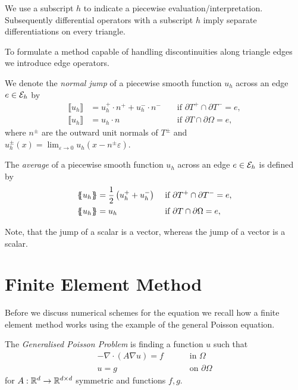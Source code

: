 We use a subscript $h$ to indicate a piecewise evaluation/interpretation. Subsequently differential operators with a subscript $h$ imply separate differentiations on every triangle.

To formulate a method capable of handling discontinuities along triangle edges we introduce edge operators.   

\begin{definition}
We denote the \emph{normal jump} of  a piecewise smooth function $u_h$ across an edge $e \in \mathcal{E}_h$ by
\begin{align*}
	\llbracket u_h \rrbracket &= u_h^+ \cdot n^+ + u_h^-\cdot n^-  &&\text{ if } \partial T^+ \cap \partial T^- = e, \\
	\llbracket u_h \rrbracket &= u_h \cdot n  &&\text{ if } \partial T \cap \partial \Omega = e,
\end{align*}
where $n^\pm$ are the outward unit normals of $T^\pm$ and  $u_h^\pm(x) = \lim_{\varepsilon \rightarrow 0} u_h(x-n^\pm \varepsilon)$.

The \emph{average} of a piecewise smooth function $u_h$ across an edge $e \in \mathcal{E}_h$ is defined by
\begin{align*}
	\laverage u_h \raverage &= \frac 1 2 \left(u_h^+ + u_h^-\right) &&\text{ if } \partial T^+ \cap \partial T^- = e, \\
	\laverage u_h  \raverage &= u_h &&\text{ if } \partial T \cap \partial \Omega = e,
\end{align*}
\end{definition}

Note, that the jump of a scalar is a vector, whereas the jump of a vector is a scalar.


\section{Finite Element Method}
Before we discuss numerical schemes for the \MA equation we recall how a finite element method works using the example of the general Poisson equation. 


\begin{definition}
The \emph{Generalised Poisson Problem} is finding a function $u$ such that 
\begin{align}
	-\nabla \cdot (A \nabla u) = f \qquad &\text{ in }\Omega \label{eq: poisson eq} \\
	u = g \qquad &\text{ on } \partial \Omega    \label{eq: poisson bc}
\end{align}
for $ A:\mathbb{R}^d \rightarrow \mathbb{R}^{d \times d}$ symmetric and functions $f,g $. 
\end{definition}

